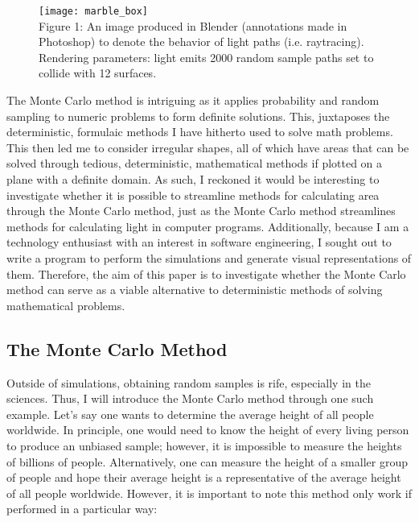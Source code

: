 \documentclass[11pt]{article}
\begin{document}
\begin{figure}[h]
\texttt{[image: marble\_box]}
\centering\\
\footnotesize\centering Figure 1: An image produced in Blender (annotations made in Photoshop) to denote the behavior of light paths (i.e. raytracing). Rendering parameters: light emits 2000 random sample paths set to collide with 12 surfaces. 
\end{figure}

\normalsize The Monte Carlo method is intriguing as it applies probability and random sampling to numeric problems to form definite solutions. This, juxtaposes the deterministic, formulaic methods I have hitherto used to solve math problems. This then led me to consider irregular shapes, all of which have areas that can be solved through tedious, deterministic, mathematical methods if plotted on a plane with a definite domain. As such, I reckoned it would be interesting to investigate whether it is possible to streamline methods for calculating area through the Monte Carlo method, just as the Monte Carlo method streamlines methods for calculating light in computer programs. Additionally, because I am a technology enthusiast with an interest in software engineering, I sought out to write a program to perform the simulations and generate visual representations of them. Therefore, the aim of this paper is to investigate whether the Monte Carlo method can serve as a viable alternative to deterministic methods of solving mathematical problems.


\subsection{The Monte Carlo Method}

Outside of simulations, obtaining random samples is rife, especially in the sciences. Thus, I will introduce the Monte Carlo method through one such example. Let's say one wants to determine the average height of all people worldwide. In principle, one would need to know the height of every living person to produce an unbiased sample; however, it is impossible to measure the heights of billions of people. Alternatively, one can measure the height of a smaller group of people and hope their average height is a representative of the average height of all people worldwide. However, it is important to note this method only work if performed in a particular way:
\end{document}
